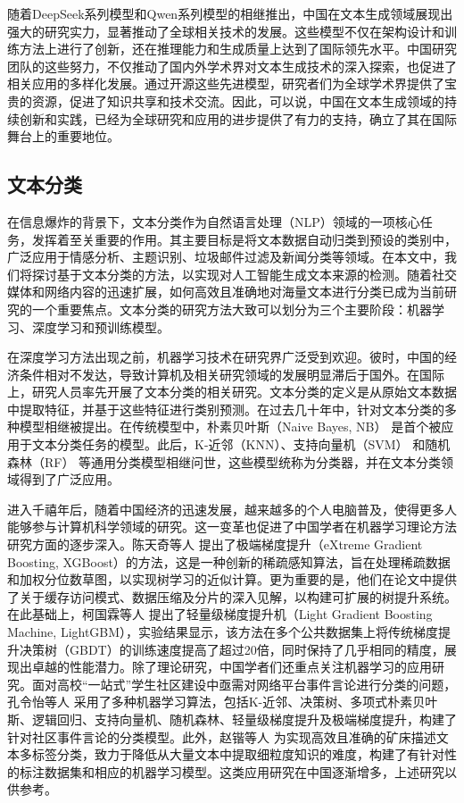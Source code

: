随着DeepSeek系列模型和Qwen系列模型的相继推出，中国在文本生成领域展现出强大的研究实力，显著推动了全球相关技术的发展。这些模型不仅在架构设计和训练方法上进行了创新，还在推理能力和生成质量上达到了国际领先水平。中国研究团队的这些努力，不仅推动了国内外学术界对文本生成技术的深入探索，也促进了相关应用的多样化发展。通过开源这些先进模型，研究者们为全球学术界提供了宝贵的资源，促进了知识共享和技术交流。因此，可以说，中国在文本生成领域的持续创新和实践，已经为全球研究和应用的进步提供了有力的支持，确立了其在国际舞台上的重要地位。

\subsection{文本分类}
\label{sec:intro-inout-textclassify}


在信息爆炸的背景下，文本分类作为自然语言处理（NLP）领域的一项核心任务，发挥着至关重要的作用。其主要目标是将文本数据自动归类到预设的类别中，广泛应用于情感分析、主题识别、垃圾邮件过滤及新闻分类等领域。在本文中，我们将探讨基于文本分类的方法，以实现对人工智能生成文本来源的检测。随着社交媒体和网络内容的迅速扩展，如何高效且准确地对海量文本进行分类已成为当前研究的一个重要焦点。文本分类的研究方法大致可以划分为三个主要阶段：机器学习、深度学习和预训练模型。

在深度学习方法出现之前，机器学习技术在研究界广泛受到欢迎。彼时，中国的经济条件相对不发达，导致计算机及相关研究领域的发展明显滞后于国外。在国际上，研究人员率先开展了文本分类的相关研究。文本分类的定义是从原始文本数据中提取特征，并基于这些特征进行类别预测。在过去几十年中，针对文本分类的多种模型相继被提出。在传统模型中，朴素贝叶斯（Naive Bayes, NB）\cite{Maron1961AutomaticIA} 是首个被应用于文本分类任务的模型。此后，K-近邻（KNN）\cite{Cover1967NearestNP}、支持向量机（SVM）\cite{Joachims1999TextCW} 和随机森林（RF）\cite{Breiman2001RandomF} 等通用分类模型相继问世，这些模型统称为分类器，并在文本分类领域得到了广泛应用。

进入千禧年后，随着中国经济的迅速发展，越来越多的个人电脑普及，使得更多人能够参与计算机科学领域的研究。这一变革也促进了中国学者在机器学习理论方法研究方面的逐步深入。陈天奇等人\cite{Chen2016XGBoostAS} 提出了极端梯度提升（eXtreme Gradient Boosting, XGBoost）的方法，这是一种创新的稀疏感知算法，旨在处理稀疏数据和加权分位数草图，以实现树学习的近似计算。更为重要的是，他们在论文中提供了关于缓存访问模式、数据压缩及分片的深入见解，以构建可扩展的树提升系统。在此基础上，柯国霖等人\cite{Ke2017LightGBMAH} 提出了轻量级梯度提升机（Light Gradient Boosting Machine, LightGBM），实验结果显示，该方法在多个公共数据集上将传统梯度提升决策树（GBDT）的训练速度提高了超过20倍，同时保持了几乎相同的精度，展现出卓越的性能潜力。除了理论研究，中国学者们还重点关注机器学习的应用研究。面对高校“一站式”学生社区建设中亟需对网络平台事件言论进行分类的问题，孔令怡等人\cite{XDJS202421019} 采用了多种机器学习算法，包括K-近邻、决策树、多项式朴素贝叶斯、逻辑回归、支持向量机、随机森林、轻量级梯度提升及极端梯度提升，构建了针对社区事件言论的分类模型。此外，赵锴等人\cite{ZGKA202410022} 为实现高效且准确的矿床描述文本多标签分类，致力于降低从大量文本中提取细粒度知识的难度，构建了有针对性的标注数据集和相应的机器学习模型。这类应用研究在中国逐渐增多，上述研究以供参考。

